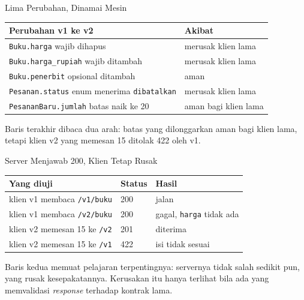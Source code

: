 \documentclass[aspectratio=169, table, 12pt]{beamer}
\begin{document}
\begin{frame}{{\Large Lima Perubahan, Dinamai Mesin}}
  \vspace{6pt}
  \centering
  {\footnotesize
  \begin{tabularx}{\textwidth}{Yl}
    \hline
    \textbf{Perubahan v1 ke v2} & \textbf{Akibat} \\
    \hline
    \texttt{Buku.harga} wajib dihapus & merusak klien lama \\
    \hline
    \texttt{Buku.harga\_rupiah} wajib ditambah & merusak klien lama \\
    \hline
    \texttt{Buku.penerbit} opsional ditambah & aman \\
    \hline
    \texttt{Pesanan.status} enum menerima \texttt{dibatalkan} & merusak klien lama \\
    \hline
    \texttt{PesananBaru.jumlah} batas naik ke 20 & aman bagi klien lama \\
    \hline
  \end{tabularx}}

  \vspace{6pt}
  {\small Baris terakhir dibaca dua arah: batas yang dilonggarkan aman bagi
  klien lama, tetapi klien v2 yang memesan 15 ditolak 422 oleh v1.}
\end{frame}

\begin{frame}{{\Large Server Menjawab 200, Klien Tetap Rusak}}
  \vspace{6pt}
  \centering
  {\footnotesize
  \begin{tabularx}{\textwidth}{Yll}
    \hline
    \textbf{Yang diuji} & \textbf{Status} & \textbf{Hasil} \\
    \hline
    klien v1 membaca \texttt{/v1/buku} & 200 & jalan \\
    \hline
    klien v1 membaca \texttt{/v2/buku} & 200 & gagal, \texttt{harga} tidak ada \\
    \hline
    klien v2 memesan 15 ke \texttt{/v2} & 201 & diterima \\
    \hline
    klien v2 memesan 15 ke \texttt{/v1} & 422 & isi tidak sesuai \\
    \hline
  \end{tabularx}}

  \vspace{6pt}
  {\small Baris kedua memuat pelajaran terpentingnya: servernya tidak salah
  sedikit pun, yang rusak kesepakatannya. Kerusakan itu hanya terlihat bila
  ada yang memvalidasi \textit{response} terhadap kontrak lama.}
\end{frame}
\end{document}
